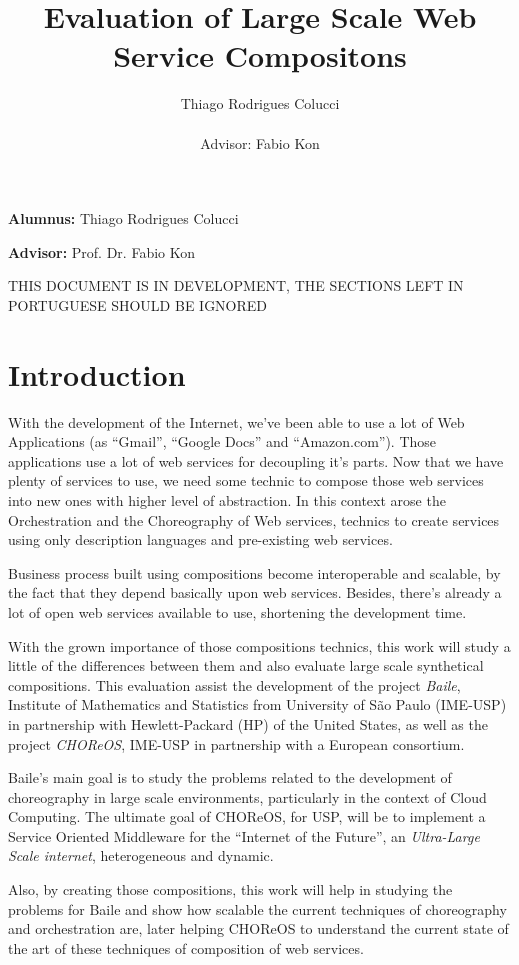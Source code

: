 \documentclass[11pt,a4paper]{article}
\title{Evaluation of Large Scale Web Service Compositons}
\author{Thiago Rodrigues Colucci\\\\Advisor: Fabio Kon}
\begin{document}
\maketitle

\newpage

\tableofcontents
\newpage
\textbf{Alumnus:} Thiago Rodrigues Colucci

\textbf{Advisor:} Prof. Dr. Fabio Kon

{\large THIS DOCUMENT IS IN DEVELOPMENT, THE SECTIONS LEFT IN PORTUGUESE SHOULD BE IGNORED}

\section{Introduction}

With the development of the Internet, we've been able to use a lot of Web Applications (as ``Gmail'', ``Google Docs'' and ``Amazon.com''). Those applications use a lot of web services for decoupling it's parts. Now that we have plenty of services to use, we need some technic to compose those web services into new ones with higher level of abstraction. In this context arose the Orchestration and the Choreography of Web services, technics to create services using only description languages and pre-existing web services.

Business process built using compositions become interoperable and scalable, by the fact that they depend basically upon web services. Besides, there's already a lot of open web services available to use, shortening the development time.

With the grown importance of those compositions technics, this work will study a little of the differences between them and also evaluate large scale synthetical compositions. This evaluation assist the development of the project \emph{Baile}, Institute of Mathematics and Statistics from University of São Paulo (IME-USP) in partnership with Hewlett-Packard (HP) of the United States, as well as the project \emph{CHOReOS}, IME-USP in partnership with a European consortium.

Baile’s main goal is to study the problems related to the development of choreography in large scale environments, particularly in the context of Cloud Computing. The ultimate goal of CHOReOS, for USP, will be to implement a Service Oriented Middleware for the ``Internet of the Future'', an \emph{Ultra-Large Scale internet}, heterogeneous and dynamic.

Also, by creating those compositions, this work will help in studying the problems for Baile and show how scalable the current techniques of choreography and orchestration are, later helping CHOReOS to understand the current state of the art of these techniques of composition of web services.
\end{document}
